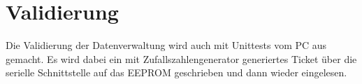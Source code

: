 \section{Validierung}
Die Validierung der Datenverwaltung wird auch mit Unittests vom PC aus gemacht.
Es wird dabei ein mit Zufallszahlengenerator generiertes Ticket über die serielle Schnittstelle auf das EEPROM geschrieben und dann wieder eingelesen.
